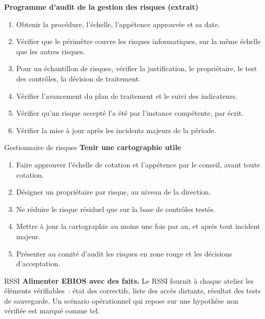 \begin{boxprocedure}
\textbf{Programme d'audit de la gestion des risques (extrait)}
\begin{enumerate}
    \item Obtenir la procédure, l'échelle, l'appétence approuvée et sa date.
    \item Vérifier que le périmètre couvre les risques informatiques, sur la
          même échelle que les autres risques.
    \item Pour un échantillon de risques, vérifier la justification, le
          propriétaire, le test des contrôles, la décision de traitement.
    \item Vérifier l'avancement du plan de traitement et le suivi des
          indicateurs.
    \item Vérifier qu'un risque accepté l'a été par l'instance compétente,
          par écrit.
    \item Vérifier la mise à jour après les incidents majeurs de la période.
\end{enumerate}
\end{boxprocedure}

\begin{boxmetier}{Gestionnaire de risques}
\textbf{Tenir une cartographie utile}
\begin{enumerate}
    \item Faire approuver l'échelle de cotation et l'appétence par le
          conseil, avant toute cotation.
    \item Désigner un propriétaire par risque, au niveau de la direction.
    \item Ne réduire le risque résiduel que sur la base de contrôles testés.
    \item Mettre à jour la cartographie au moins une fois par an, et après
          tout incident majeur.
    \item Présenter au comité d'audit les risques en zone rouge et les
          décisions d'acceptation.
\end{enumerate}
\end{boxmetier}

\begin{boxmetier}{RSSI}
\textbf{Alimenter EBIOS avec des faits.} Le RSSI fournit à chaque atelier
les éléments vérifiables~: état des correctifs, liste des accès distants,
résultat des tests de sauvegarde. Un scénario opérationnel qui repose sur
une hypothèse non vérifiée est marqué comme tel.
\end{boxmetier}

